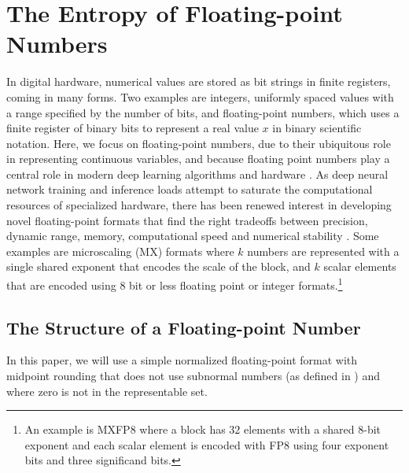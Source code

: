 \documentclass[12pt,onecolumn, margin=1in]{IEEEtran}
\begin{document}
\section{The Entropy of Floating-point Numbers}\label{sec:fpn}

In digital hardware, numerical values are stored as bit strings in finite registers, coming in many forms. Two examples are integers, uniformly spaced values with a range specified by the number of bits, and floating-point numbers, which uses a finite register of binary bits to represent a real value $x$ in binary scientific notation. 
Here, we focus on floating-point numbers, due to their ubiquitous role in representing continuous variables, and because floating point numbers play a central role in modern deep learning algorithms and hardware \cite{nvidia_nvidia_2025, advanced_micro_devices_inc_amd_2025}. 
As deep neural network training and inference loads attempt to saturate the computational resources of specialized hardware, there has been renewed interest in developing novel floating-point formats that find the right tradeoffs between precision, dynamic range, memory, computational speed and numerical stability \cite{kuzmin_fp8_2022}.
Some examples are microscaling (MX) formats \cite{rouhani_microscaling_2023, darvish_rouhani_shared_2023, su_characterization_2025} where $k$ numbers are represented with a single shared exponent that encodes the scale of the block, and $k$ scalar elements that are encoded using 8 bit or less floating point or integer formats.\footnote{An example is MXFP8 where a block has $32$ elements with a shared 8-bit exponent and each scalar element is encoded with FP8 using four exponent bits and three significand bits.} 

\subsection{The Structure of a Floating-point Number}\label{sec:fpn_structure}

In this paper, we will use a simple normalized floating-point format with midpoint rounding that does not use subnormal numbers (as defined in \cite{muller2010handbookfpn}) and where zero is not in the representable set.
\end{document}
